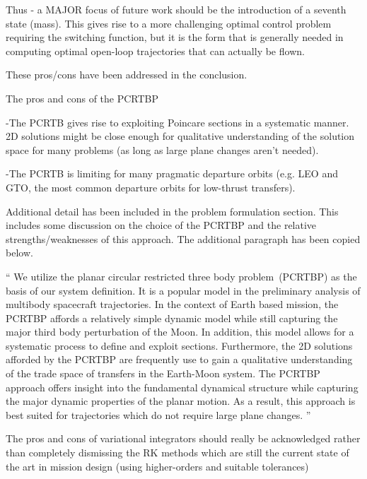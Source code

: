 \documentclass[11pt]{article}
\newenvironment{correction}{\begin{list}{}{\setlength{\leftmargin}{1cm}\setlength{\rightmargin}{1cm}}\vspace{\parsep}\item[]``}{''\end{list}}
\begin{document}
\begin{itemize}
\begin{itshape}
Thus - a MAJOR focus of future work should be the introduction of a seventh state (mass).  This gives rise to a more challenging optimal control problem requiring the switching function, but it is the form that is generally needed in computing optimal open-loop trajectories that can actually be flown.
\end{itshape}

These pros/cons have been addressed in the conclusion.

\item 
    \begin{itshape}
The pros and cons of the PCRTBP

-The PCRTB gives rise to exploiting Poincare sections in a systematic manner.  2D solutions might be close enough for qualitative understanding of the solution space for many problems (as long as large plane changes aren't needed).

-The PCRTB is limiting for many pragmatic departure orbits (e.g. LEO and GTO, the most common departure orbits for low-thrust transfers).
\end{itshape}

Additional detail has been included in the problem formulation section.
This includes some discussion on the choice of the PCRTBP and the relative strengths/weaknesses of this approach.
The additional paragraph has been copied below.

\begin{correction}
We utilize the planar circular restricted three body problem~(PCRTBP) as the basis of our system definition. 
It is a popular model in the preliminary analysis of multibody spacecraft trajectories. 
In the context of Earth based mission, the PCRTBP affords a relatively simple dynamic model while still capturing the major third body perturbation of the Moon.
In addition, this model allows for a systematic process to define and exploit \Poincare sections.
Furthermore, the 2D solutions afforded by the PCRTBP are frequently use to gain a qualitative understanding of the trade space of transfers in the Earth-Moon system.
The PCRTBP approach offers insight into the fundamental dynamical structure while capturing the major dynamic properties of the planar motion.
As a result, this approach is best suited for trajectories which do not require large plane changes.
\end{correction}

\item 
    \begin{itshape}
The pros and cons of variational integrators should really be acknowledged rather than completely dismissing the RK methods which are still the current state of the art in mission design (using higher-orders and suitable tolerances)


\end{itshape}
\end{itemize}
\end{document}
